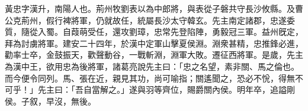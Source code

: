 \begin{pinyinscope}
 
 
 黃忠字漢升，南陽人也。荊州牧劉表以為中郎將，與表從子磐共守長沙攸縣。及曹公克荊州，假行裨將軍，仍就故任，統屬長沙太守韓玄。先主南定諸郡，忠遂委質，隨從入蜀。自葭萌受任，還攻劉璋，忠常先登陷陣，勇毅冠三軍。益州旣定，拜為討虜將軍。建安二十四年，於漢中定軍山擊夏侯淵。淵衆甚精，忠推鋒必進，勸率士卒，金鼓振天，歡聲動谷，一戰斬淵，淵軍大敗。遷征西將軍。是歲，先主為漢中王，欲用忠為後將軍，諸葛亮說先主曰：「忠之名望，素非關、馬之倫也。而今便令同列。馬、張在近，親見其功，尚可喻指；關遙聞之，恐必不恱，得無不可乎！」先主曰：「吾自當解之。」遂與羽等齊位，賜爵關內侯。明年卒，追謚剛侯。子叙，早沒，無後。
 
 
\end{pinyinscope}